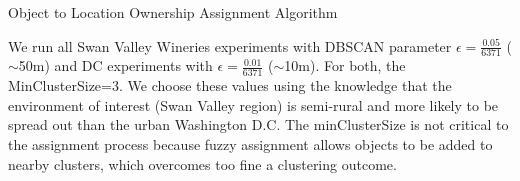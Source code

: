 \begin{algorithm}
    \caption{Object to Location Ownership Assignment Algorithm}
    \label{alg:OwnershipAssignment}
    \begin{algorithmic}
        \State{- - - - - - - - - -}
                \EndFor
            \EndFor
            \EndFor
            \EndFor 
        \EndProcedure
    \end{algorithmic}
\end{algorithm}
\normalsize

We run all Swan Valley Wineries experiments with DBSCAN parameter $\epsilon = \frac{0.05}{6371}$ ($\sim$50m) and DC experiments with $\epsilon = \frac{0.01}{6371}$ ($\sim$10m). For both, the MinClusterSize=$3$. We choose these values using the knowledge that the environment of interest (Swan Valley region) is semi-rural and more likely to be spread out than the urban Washington D.C. %
The minClusterSize is not critical to the assignment process because fuzzy assignment allows objects to be added to nearby clusters, which overcomes too fine a clustering outcome. 





